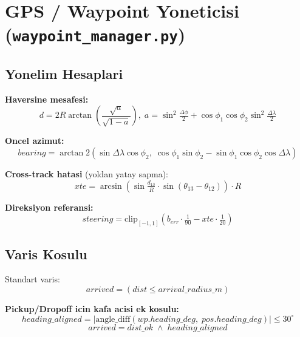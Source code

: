 \documentclass[a4paper,12pt]{article}
\begin{document}
\section{GPS / Waypoint Yoneticisi (\texttt{waypoint\_manager.py})}

\subsection{Yonelim Hesaplari}

\textbf{Haversine mesafesi:}
\begin{equation}
  d = 2R \arctan\!\left(\frac{\sqrt{a}}{\sqrt{1-a}}\right),\;
  a = \sin^2\!\tfrac{\Delta\phi}{2} + \cos\phi_1\cos\phi_2\sin^2\!\tfrac{\Delta\lambda}{2}
\end{equation}

\textbf{Oncel azimut:}
\begin{equation}
  bearing = \arctan2\!\left(\sin\Delta\lambda\cos\phi_2,\;
            \cos\phi_1\sin\phi_2 - \sin\phi_1\cos\phi_2\cos\Delta\lambda\right)
\end{equation}

\textbf{Cross-track hatasi} (yoldan yatay sapma):
\begin{equation}
  xte = \arcsin\!\left(\sin\tfrac{d_{13}}{R}\cdot\sin(\theta_{13}-\theta_{12})\right)\cdot R
\end{equation}

\textbf{Direksiyon referansi:}
\begin{equation}
  steering = \text{clip}_{[-1,1]}\!\left(b_{err} \cdot \tfrac{1}{90} - xte \cdot \tfrac{1}{20}\right)
\end{equation}

\subsection{Varis Kosulu}

Standart varis:
\begin{equation}
  arrived = (dist \leq arrival\_radius\_m)
\end{equation}

\textbf{Pickup/Dropoff icin kafa acisi ek kosulu:}
\begin{equation}
  heading\_aligned = \bigl|\text{angle\_diff}(wp.heading\_deg,\; pos.heading\_deg)\bigr| \leq 30^\circ
\end{equation}
\begin{equation}
  arrived = dist\_ok \;\wedge\; heading\_aligned
\end{equation}
\end{document}

